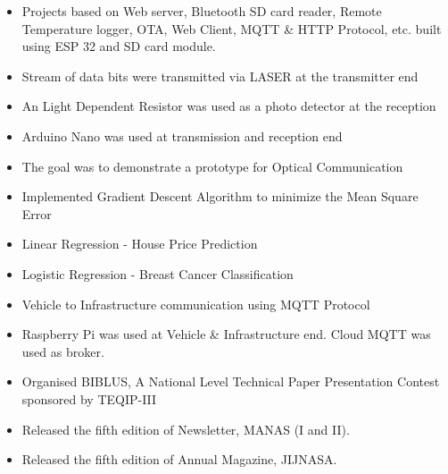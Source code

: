 \documentclass[10pt,a4paper,ragged2e]{altacv}
\begin{document}


\begin{itemize}
\item Projects based on Web server, Bluetooth SD card reader, Remote Temperature logger, OTA, Web Client, MQTT \& HTTP Protocol, etc. built using ESP 32 and SD card module.
\end{itemize}

\divider

\begin{itemize}
\item Stream of data bits were transmitted via LASER at the transmitter end
\item An Light Dependent Resistor was used as a photo detector at the reception
\item Arduino Nano was used at transmission and reception end
\item The goal was to demonstrate a  prototype for Optical Communication
\end{itemize}

\divider

\begin{itemize}
\item Implemented Gradient Descent Algorithm to minimize the Mean Square Error 
\item Linear Regression - House Price Prediction
\item Logistic Regression - Breast Cancer Classification 
\end{itemize}

\divider

\begin{itemize}
\item Vehicle to Infrastructure communication  using MQTT Protocol
\item Raspberry Pi was used at Vehicle \& Infrastructure end. Cloud MQTT was used as broker.
\end{itemize}

\divider 
\newpage

{}
\begin{itemize}
\item Organised BIBLUS, A National Level Technical Paper Presentation Contest sponsored by TEQIP-III
\item Released the fifth edition of Newsletter, MANAS (I and II).
\item Released the fifth edition of Annual Magazine, JIJNASA.
\end{itemize}
\end{document}
